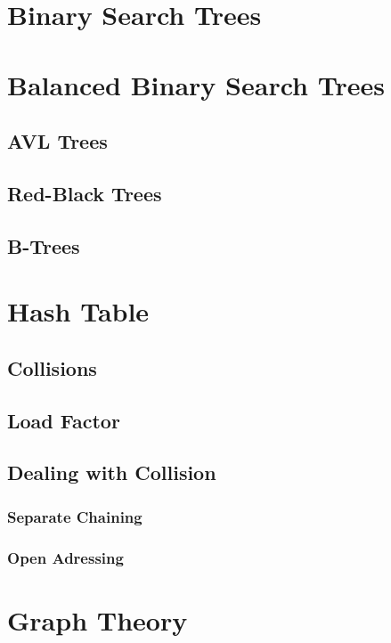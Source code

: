 \documentclass{article}
\begin{document}
\section{Binary Search Trees}

\section{Balanced Binary Search Trees}

\subsection{AVL Trees}

\subsection{Red-Black Trees}

\subsection{B-Trees}

\section{Hash Table}

\subsection{Collisions}

\subsection{Load Factor}

\subsection{Dealing with Collision}

\subsubsection{Separate Chaining}
\subsubsection{Open Adressing}

\section{Graph Theory}
\end{document}
